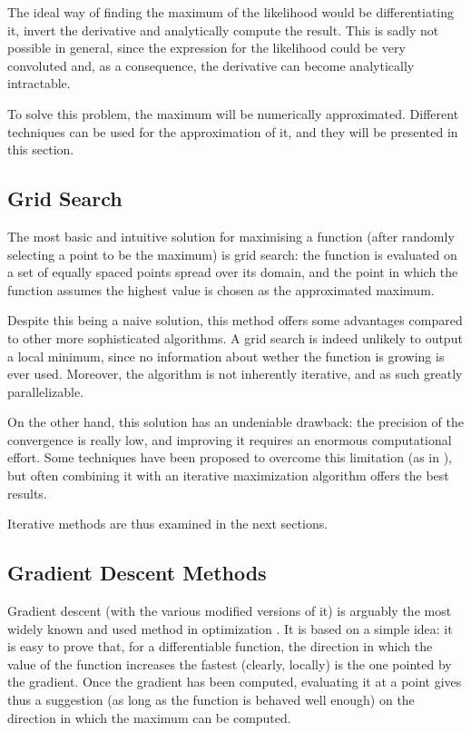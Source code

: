The ideal way of finding the maximum of the likelihood would be differentiating it,
invert the derivative and analytically compute the result.
This is sadly not possible in general,
since the expression for the likelihood could be very convoluted and,
as a consequence,
the derivative can become analytically intractable.

To solve this problem,
the maximum will be numerically approximated.
Different techniques can be used for the approximation of it,
and they will be presented in this section.

\subsection{Grid Search}
\label{sec:grid_search}

The most basic and intuitive solution for maximising a function (after randomly selecting a point to be the maximum) is grid search:
the function is evaluated on a set of equally spaced points spread over its domain,
and the point in which the function assumes the highest value is chosen as the approximated maximum.

Despite this being a naive solution,
this method offers some advantages compared to other more sophisticated algorithms.
A grid search is indeed unlikely to output a local minimum,
since no information about wether the function is growing is ever used.
Moreover, the algorithm is not inherently iterative,
and as such greatly parallelizable.

On the other hand,
this solution has an undeniable drawback:
the precision of the convergence is really low,
and improving it requires an enormous computational effort.
Some techniques have been proposed to overcome this limitation
(as in \cite{pathak2024randomizedgridsearchhyperparametertuning,postuvan2022adagridadaptivegridsearch}),
but often combining it with an iterative maximization algorithm offers the best results.

Iterative methods are thus examined in the next sections.

\subsection{Gradient Descent Methods}
\label{sec:grad_desc}

Gradient descent (with the various modified versions of it) is arguably the most widely known and used method in optimization \parencite{ruder2017overviewgradientdescentoptimization}.
It is based on a simple idea:
it is easy to prove that, for a differentiable function,
the direction in which the value of the function increases the fastest (clearly, locally)
is the one pointed by the gradient.
Once the gradient has been computed, evaluating it at a point gives thus a suggestion (as long as the function is behaved well enough) on the direction in which the maximum can be computed.

